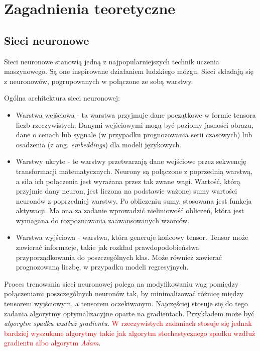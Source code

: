 \chapter{Zagadnienia teoretyczne}


\section{Sieci neuronowe}

Sieci neuronowe stanowią jedną z najpopularniejszych technik uczenia maszynowego.
Są one inspirowane działaniem ludzkiego mózgu.
Sieci składają się z neuronowów, pogrupowanych w połączone ze sobą warstwy.

Ogólna architektura sieci neuronowej:
\begin{itemize}
    \item Warstwa wejściowa - ta warstwa przyjmuje dane początkowe w formie tensora liczb rzeczywistych.
    Danymi wejściowymi mogą być poziomy jasności obrazu, dane o cenach lub sygnale (w przypadku prognozowania serii czasowych) lub osadzenia (z ang. \textit{embeddings}) dla modeli językowych.
    \item Warstwy ukryte - te warstwy przetwarzają dane wejściowe przez sekwencję transformacji matematycznych.
    Neurony są połączone z poprzednią warstwą, a siła ich połączenia jest wyrażana przez tak zwane wagi.
    Wartość, którą przyjmie dany neuron, jest liczona na podstawie ważonej sumy wartości neuronów z poprzedniej warstwy.
    Po obliczeniu sumy, stosowana jest funkcja aktywacji.
    Ma ona za zadanie wprowadzić nieliniowość obliczeń, która jest wymagana do rozpoznawania zaawansowanych wzorców.
    \item Warstwa wyjściowa - warstwa, która generuje końcowy tensor.
    Tensor może zawierać informacje, takie jak rozkład prawdopodobieństwa przyporządkowania do poszczególnych klas.
    Może również zawierać prognozowaną liczbę, w przypadku modeli regresyjnych.
\end{itemize}

Proces trenowania sieci neuronowej polega na modyfikowaniu wag pomiędzy połączeniami poszczególnych neuronów tak, by minimalizować różnicę między tensorem wyjściowym, a tensorem oczekiwanym.
Najczęściej stosuje się do tego zadania algorytmy optymalizacyjne oparte na gradientach.
Przykładem może być \textit{algorytm spadku wzdłuż gradientu}.
\textcolor{red}{W rzeczywistych zadaniach stosuje się jednak bardziej wyszukane algorytmy takie jak algorytm stochastycznego spadku wzdłuż gradientu albo algorytm \textit{Adam}}.

